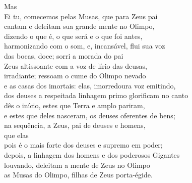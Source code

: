 \begin{pages}
\begin{Rightside}
\quad{}Mas  \\
Ei tu, comecemos pelas Musas, que para Zeus pai\\
cantam e deleitam sua grande mente no Olimpo,\\
dizendo o que é, o que será e o que foi antes,\\
harmonizando com o som, e, incansável, flui sua voz\\
das bocas, doce; sorri a morada do pai \\
Zeus altissoante com a voz de lírio das deusas,\\
irradiante; ressoam o cume do Olimpo nevado\\
e as casas dos imortais: elas, imorredoura voz emitindo,\\
dos deuses a respeitada linhagem primo glorificam no canto\\
dês o início, estes que Terra e amplo  pariram, \\
e estes que deles nasceram, os deuses oferentes de bens;\\
na sequência, a Zeus, pai de deuses e homens,\\
que elas \\
pois é o mais forte dos deuses e supremo em poder;\\
depois, a linhagem dos homens e dos poderosos Gigantes \\
louvando, deleitam a mente de Zeus no Olimpo\\
as Musas do Olimpo, filhas de Zeus porta-égide.\\


\end{Rightside}
\end{pages}
